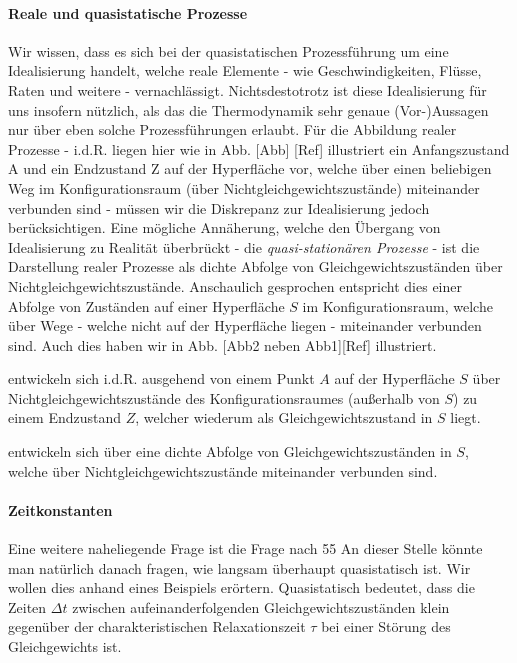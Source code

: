 \paragraph*{Reale und quasistatische Prozesse}
Wir wissen, dass es sich bei der quasistatischen Prozessführung um eine Idealisierung handelt, welche reale Elemente - wie Geschwindigkeiten, Flüsse, Raten und weitere - vernachlässigt. 
Nichtsdestotrotz ist diese Idealisierung für uns insofern nützlich, als das die Thermodynamik sehr genaue (Vor-)Aussagen nur über eben solche Prozessführungen erlaubt.
Für die Abbildung realer Prozesse - i.d.R. liegen hier wie in Abb. [Abb] [Ref] illustriert ein Anfangszustand A und ein Endzustand Z auf der Hyperfläche vor, welche über einen beliebigen Weg im Konfigurationsraum (über Nichtgleichgewichtszustände) miteinander verbunden sind - müssen wir die Diskrepanz zur Idealisierung jedoch berücksichtigen. 
Eine mögliche Annäherung, welche den Übergang von Idealisierung zu Realität überbrückt - die \emph{quasi-stationären Prozesse} - ist die Darstellung realer Prozesse als dichte Abfolge von Gleichgewichtszuständen über Nichtgleichgewichtszustände. Anschaulich gesprochen entspricht dies einer Abfolge von Zuständen auf einer Hyperfläche $S$ im Konfigurationsraum, welche über Wege - welche nicht auf der Hyperfläche liegen - miteinander verbunden sind. Auch dies haben wir in Abb. [Abb2 neben Abb1][Ref] illustriert.    
\begin{formal}
      entwickeln sich i.d.R. ausgehend von einem Punkt $A$ auf der Hyperfläche $S$ über Nichtgleichgewichtszustände des Konfigurationsraumes (außerhalb von $S$) zu einem Endzustand $Z$, welcher wiederum als Gleichgewichtszustand in $S$ liegt.
     
      entwickeln sich über eine dichte Abfolge von Gleichgewichtszuständen in $S$, welche über Nichtgleichgewichtszustände miteinander verbunden sind.
 \end{formal}

\paragraph*{Zeitkonstanten}
Eine weitere naheliegende Frage ist die Frage nach 55
An dieser Stelle könnte man natürlich danach fragen, wie langsam überhaupt quasistatisch ist. 
Wir wollen dies anhand eines Beispiels erörtern. 
Quasistatisch bedeutet, dass die Zeiten $\Delta t$ zwischen aufeinanderfolgenden Gleichgewichtszuständen klein gegenüber der charakteristischen Relaxationszeit $\tau$ bei einer Störung des Gleichgewichts ist. 

